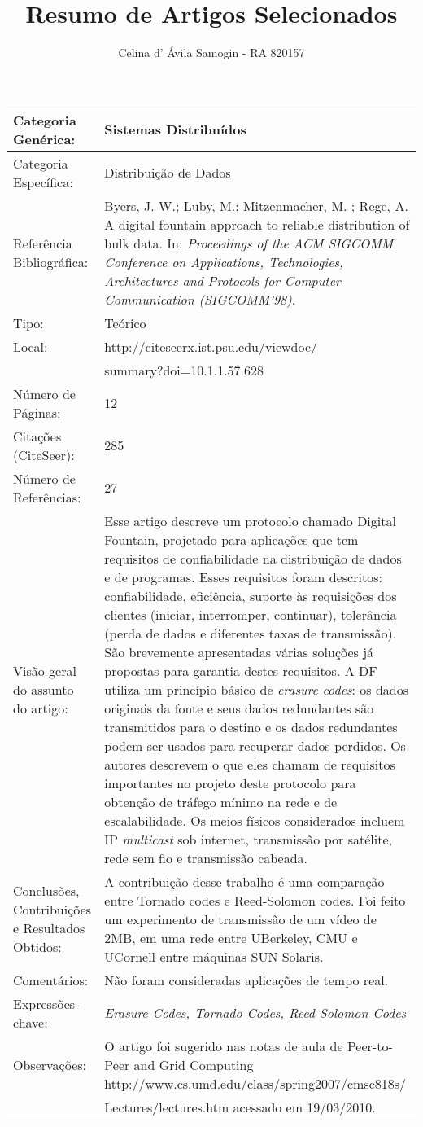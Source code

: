 \documentclass[10pt,a4paper]{article}
\title{Resumo de Artigos Selecionados}
\author{Celina d' Ávila Samogin - RA 820157}
\begin{document}
\maketitle
\thispagestyle{empty}
\newpage

\begin{center}
\begin{tabular}{|p{5cm}||p{10cm}|}
\hline
Categoria Genérica: & Sistemas Distribuídos\\\hline
Categoria Específica: & Distribuição de Dados\\\hline
Referência Bibliográfica: & Byers, J. W.; Luby, M.; Mitzenmacher, M. ; Rege, A. A digital fountain approach to reliable distribution of bulk data. In: \emph{Proceedings of the ACM SIGCOMM Conference on Applications, Technologies, Architectures and Protocols for Computer Communication (SIGCOMM'98)}.\\\hline
Tipo: & Teórico\\\hline
Local: & http://citeseerx.ist.psu.edu/viewdoc/\\ & summary?doi=10.1.1.57.628\\\hline
Número de Páginas: & 12\\\hline
Citações (CiteSeer): & 285\\\hline
Número de Referências: & 27\\\hline
Visão geral do assunto do artigo: &  Esse artigo descreve um protocolo chamado Digital Fountain, projetado para aplicações que tem requisitos de confiabilidade na distribuição de dados e de programas. Esses requisitos foram descritos: confiabilidade, eficiência, suporte às requisições dos clientes (iniciar, interromper, continuar), tolerância (perda de dados e diferentes taxas de transmissão). São brevemente apresentadas várias soluções já propostas para garantia destes requisitos. A DF utiliza um princípio básico de \emph{erasure codes}: os dados originais da fonte e seus dados redundantes são transmitidos para o destino e os dados redundantes podem ser usados para recuperar dados perdidos. Os autores descrevem o que eles chamam de requisitos importantes no projeto deste protocolo para obtenção de tráfego mínimo na rede e de escalabilidade. Os meios físicos considerados incluem IP \emph{multicast} sob internet, transmissão por satélite, rede sem fio e transmissão cabeada.\\\hline
Conclusões, Contribuições e Resultados Obtidos: & A contribuição desse trabalho é uma comparação entre Tornado codes e Reed-Solomon codes. Foi feito um experimento de transmissão de um vídeo de 2MB, em uma rede entre UBerkeley, CMU e UCornell entre máquinas SUN Solaris.\\\hline
Comentários: & Não foram consideradas aplicações de tempo real.\\\hline
Expressões-chave: & \emph{Erasure Codes, Tornado Codes, Reed-Solomon Codes}\\\hline
Observações: & O artigo foi sugerido nas notas de aula de Peer-to-Peer and Grid Computing http://www.cs.umd.edu/class/spring2007/cmsc818s/\\ & Lectures/lectures.htm acessado em 19/03/2010.\\\hline
\end{tabular}
\end{center}
\end{document}

